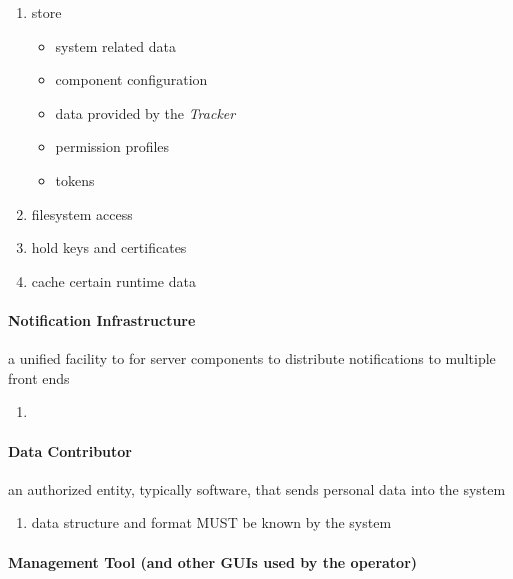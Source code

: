 \documentclass[12pt,english,a4paper,titlepage,cleardoublepage=empty,dottedtoc]{report}
\providecommand{\tightlist}{%
  \setlength{\itemsep}{0pt}\setlength{\parskip}{0pt}}
\begin{document}
\begin{enumerate}
\def\labelenumi{\alph{enumi})}
\tightlist
\item
  store

  \begin{itemize}
  \tightlist
  \item
    system related data
  \item
    component configuration
  \item
    data provided by the \emph{Tracker}
  \item
    permission profiles
  \item
    tokens
  \end{itemize}
\item
  filesystem access
\item
  hold keys and certificates
\item
  cache certain runtime data
\end{enumerate}

\paragraph{Notification
Infrastructure}\label{notification-infrastructure}

a unified facility to for server components to distribute notifications
to multiple front ends

\begin{enumerate}
\def\labelenumi{\alph{enumi})}
\item
\end{enumerate}

\paragraph{Data Contributor}\label{data-contributor}

an authorized entity, typically software, that sends personal data into
the system

\begin{enumerate}
\def\labelenumi{\alph{enumi})}
\tightlist
\item
  data structure and format MUST be known by the system
\end{enumerate}

\paragraph{Management Tool (and other GUIs used by the
operator)}\label{management-tool-and-other-guis-used-by-the-operator}
\end{document}

